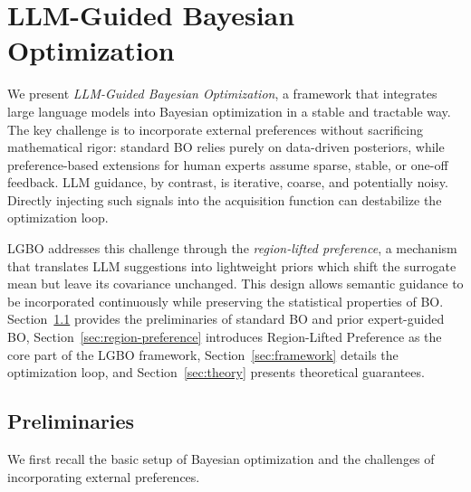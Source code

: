 \documentclass{article} %
\newcommand{\chen}[1]{\textcolor{red}{#1}}
\begin{document}


\section{LLM-Guided Bayesian Optimization}
\label{sec:method}

We present \emph{LLM-Guided Bayesian Optimization}, a framework that integrates large language models into Bayesian optimization in a stable and tractable way. The key challenge is to incorporate external preferences without sacrificing mathematical rigor: standard BO relies purely on data-driven posteriors, while preference-based extensions for human experts assume sparse, stable, or one-off feedback. LLM guidance, by contrast, is iterative, coarse, and potentially noisy. Directly injecting such signals into the acquisition function can destabilize the optimization loop.

LGBO addresses this challenge through the \emph{region-lifted preference}, a mechanism that translates LLM suggestions into lightweight priors which shift the surrogate mean but leave its covariance unchanged. This design allows semantic guidance to be incorporated continuously while preserving the statistical properties of BO. Section~\ref{sec:preliminaries} provides the preliminaries of standard BO and prior expert-guided BO, Section~\ref{sec:region-preference} introduces Region-Lifted Preference as the core part of the LGBO framework, Section~\ref{sec:framework} details the optimization loop, and Section~\ref{sec:theory} presents theoretical guarantees.

\subsection{Preliminaries}
\label{sec:preliminaries}
We first recall the basic setup of Bayesian optimization and the challenges of incorporating external preferences. 
\end{document}
